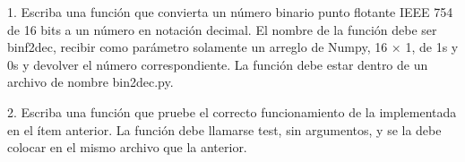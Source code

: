 \documentclass[letterpaper,oneside]{article}
\begin{document}
	
\templatePortrait

\templatePagecfg



	
1. Escriba una función que convierta un número binario punto flotante IEEE
754 de 16 bits a un número en notación decimal. El nombre de la función
debe ser binf2dec, recibir como parámetro solamente un arreglo de Numpy,
16 × 1, de 1s y 0s y devolver el número correspondiente. La función debe
estar dentro de un archivo de nombre bin2dec.py.


2. Escriba una función que pruebe el correcto funcionamiento de la implementada en el ítem anterior. La función debe llamarse test, sin argumentos, y se la debe colocar en el mismo archivo que la anterior.


\templateIndex

\templateFinalcfg




\end{document}
